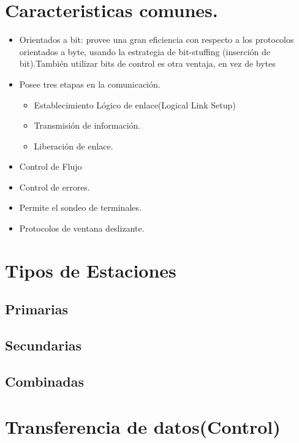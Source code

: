\documentclass[12pt, fleqn]{report}                             %
\theoremstyle{break}                                            %
\begin{document}
        \section{Caracteristicas comunes.}
        \begin{itemize}
            \item Orientados a bit: provee una gran eficiencia con respecto a los protocolos orientados a byte,
                usando la estrategia de bit-stuffing (inserción de bit).También utilizar bits de control es otra
                ventaja, en vez de bytes
                            \item Posee tres etapas en la comunicación.
                            \begin{itemize}
                                \item Establecimiento Lógico de enlace(Logical Link Setup)
                                \item Transmisión de información.
                                \item Liberación de enlace.
                            \end{itemize}
                            \item Control de Flujo
                            \item Control de errores.
                            \item Permite el sondeo de terminales.
                            \item Protocolos de ventana deslizante.

        \end{itemize}


            \section{Tipos de Estaciones}
            \subsection{Primarias}
            \subsection{Secundarias}
            \subsection{Combinadas}
            \section{Transferencia de datos(Control)}
\end{document}
